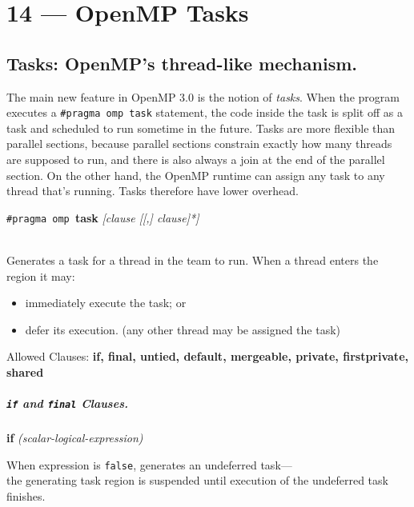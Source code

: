 \documentclass[a4paper]{report}
\begin{document}
\chapter*{14 --- OpenMP Tasks}


\section*{Tasks: OpenMP's thread-like mechanism.}
The main new feature in OpenMP 3.0 is the notion of \emph{tasks}. When
the program executes a \verb+#pragma omp task+ statement, the code
inside the task is split off as a task and scheduled to run sometime
in the future. Tasks are more flexible than parallel sections, because
parallel sections constrain exactly how many threads are supposed to
run, and there is also always a join at the end of the parallel
section.  On the other hand, the OpenMP runtime can assign any task to
any thread that's running. Tasks therefore have lower overhead.


  \begin{center}
    {\tt \#pragma omp }{\bf task} {\it [clause [[,] clause]*]}
  \end{center}~\\

Generates a task for a thread in the team to run.
     When a thread enters the region it may:
\begin{itemize}
        \item immediately execute the task; or
        \item defer its execution. (any other thread may be assigned the task)
\end{itemize}

  Allowed Clauses: {\bf if, final, untied, default, mergeable, private,
  firstprivate, shared}

\paragraph{{\tt if} and {\tt final} Clauses.}

  \begin{center}
  {\bf if} {\it(scalar-logical-expression)}
  \end{center}

    When expression is {\tt false}, generates an undeferred task---\\
    the generating task region is suspended until execution of the
      undeferred task finishes.\\[1em]
\end{document}
